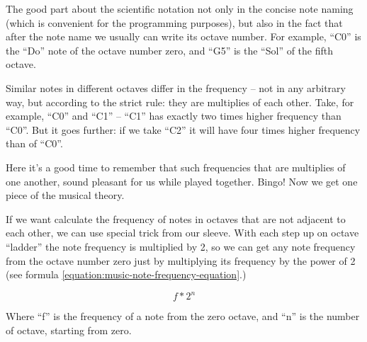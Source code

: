 \documentclass[../sparc.tex]{subfiles}
\begin{document}
The good part about the scientific notation not only in the concise note naming
(which is convenient for the programming purposes), but also in the fact that
after the note name we usually can write its octave number.  For example, ``C0''
is the ``Do'' note of the octave number zero, and ``G5'' is the ``Sol'' of the
fifth octave.

Similar notes in different octaves differ in the frequency -- not in any
arbitrary way, but according to the strict rule: they are multiplies of each
other.  Take, for example, ``C0'' and ``C1'' -- ``C1'' has exactly two times
higher frequency than ``C0''.  But it goes further: if we take ``C2'' it will
have four times higher frequency than of ``C0''.

Here it's a good time to remember that such frequencies that are multiplies of
one another, sound pleasant for us while played together.  Bingo!  Now we get
one piece of the musical theory.

If we want calculate the frequency of notes in octaves that are not adjacent to
each other, we can use special trick from our sleeve.  With each step up on
octave ``ladder'' the note frequency is multiplied by 2, so we can get any note
frequency from the octave number zero just by multiplying its frequency by the
power of 2 (see formula \ref{equation:music-note-frequency-equation}.)

\begin{equation}
  f * 2^n
  \label{equation:music-note-frequency-equation}
\end{equation}

Where ``f'' is the frequency of a note from the zero octave, and ``n'' is the
number of octave, starting from zero.
\end{document}

